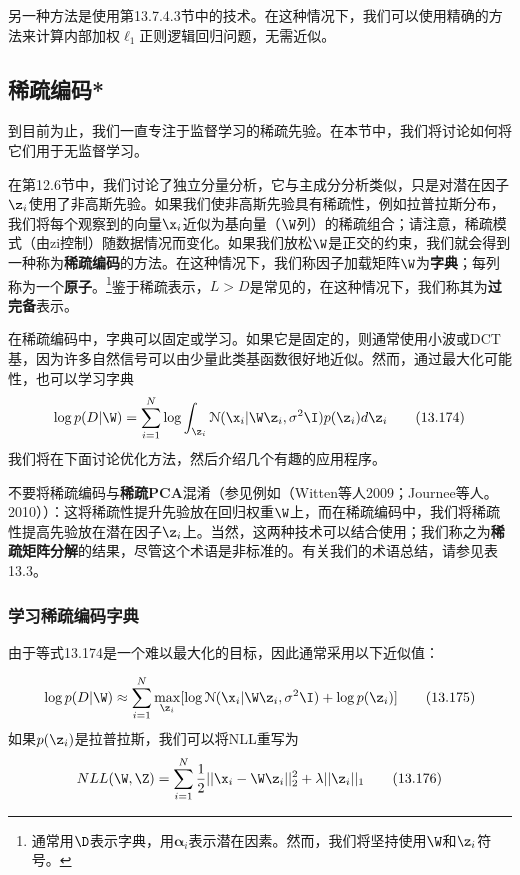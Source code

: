 \documentclass[a4paper]{article}
\begin{document}
另一种方法是使用第13.7.4.3节中的技术。在这种情况下，我们可以使用精确的方法来计算内部加权$\ell_1$正则逻辑回归问题，无需近似。

\subsection{稀疏编码*}
到目前为止，我们一直专注于监督学习的稀疏先验。在本节中，我们将讨论如何将它们用于无监督学习。

在第12.6节中，我们讨论了独立分量分析，它与主成分分析类似，只是对潜在因子$\z_i$使用了非高斯先验。如果我们使非高斯先验具有稀疏性，例如拉普拉斯分布，我们将每个观察到的向量$\x_i$近似为基向量（$\W$列）的稀疏组合；请注意，稀疏模式（由zi控制）随数据情况而变化。如果我们放松$\W$是正交的约束，我们就会得到一种称为\textbf{稀疏编码}的方法。在这种情况下，我们称因子加载矩阵$\W$为\textbf{字典}；每列称为一个\textbf{原子}。\footnote{通常用$\D$表示字典，用$\boldsymbol{\alpha}_i$表示潜在因素。然而，我们将坚持使用$\W$和$\z_i$符号。}鉴于稀疏表示，$L>D$是常见的，在这种情况下，我们称其为\textbf{过完备}表示。

在稀疏编码中，字典可以固定或学习。如果它是固定的，则通常使用小波或DCT基，因为许多自然信号可以由少量此类基函数很好地近似。然而，通过最大化可能性，也可以学习字典
\begin{equation}
	\log p(D|\W)=\sum_{i=1}^{N}\log \int_{\z_i}\mathcal{N}(\x_i|\W\z_i,\sigma^2\I)p(\z_i)d\z_i\tag{13.174}
\end{equation}
我们将在下面讨论优化方法，然后介绍几个有趣的应用程序。

不要将稀疏编码与\textbf{稀疏PCA}混淆（参见例如（Witten等人2009；Journee等人。2010））：这将稀疏性提升先验放在回归权重$\W$上，而在稀疏编码中，我们将稀疏性提高先验放在潜在因子$\z_i$上。当然，这两种技术可以结合使用；我们称之为\textbf{稀疏矩阵分解}的结果，尽管这个术语是非标准的。有关我们的术语总结，请参见表13.3。

\subsubsection{学习稀疏编码字典}
由于等式13.174是一个难以最大化的目标，因此通常采用以下近似值：

\begin{equation}
	\log p(D|\W)\approx \sum_{i=1}^{N}\max_{\z_i}[\log \mathcal{N}(\x_i|\W\z_i,\sigma^2\I)+\log p(\z_i)]\tag{13.175}
\end{equation}
如果$p(\z_i)$是拉普拉斯，我们可以将NLL重写为
\begin{equation}
	NLL(\W,\Z)=\sum_{i=1}^{N}\frac{1}{2}||\x_i-\W\z_i||_2^2+\lambda||\z_i||_1\tag{13.176}
\end{equation}
\end{document}
